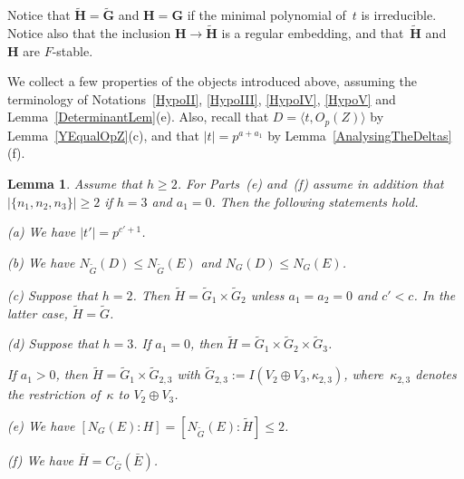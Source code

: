 \documentclass[12pt]{amsart}
\newcommand{\bG}{{\mathbf{G}}}      %
\newcommand{\bH}{{\mathbf{H}}}
\newtheorem{lem}[thm]{Lemma}
\theoremstyle{theorem}
\theoremstyle{definition}
\theoremstyle{remark}
\begin{document}
Notice that $\tilde{\bH} = \tilde{\bG}$ and $\bH = \bG$ if the minimal 
polynomial of~$t$ is irreducible. Notice also that the inclusion 
$\bH \rightarrow \tilde{\bH}$ is a regular embedding, and that~$\tilde{\bH}$ 
and ~$\bH$ are $F$-stable.

We collect a few properties of the objects introduced above, assuming the
terminology of
{\rm Notations~\ref{HypoII}, \ref{HypoIII}, \ref{HypoIV}, \ref{HypoV}} and
{\rm Lemma~\ref{DeterminantLem}(e)}. Also, recall that 
$D = \langle t , O_p( Z ) \rangle$ by Lemma~\ref{YEqualOpZ}(c),
and that $|t| = p^{a+a_1}$ by Lemma~\ref{AnalysingTheDeltas}(f).

\begin{lem}
\label{PropertiesOfDPrime}
Assume that $h \geq 2$. For Parts~{\rm (e)} and~{\rm (f)} assume in addition 
that $|\{ n_1, n_2, n_3 \}| \geq 2$ if $h = 3$ and $a_1 = 0$. Then the 
following statements hold.

{\rm (a)} We have $|t'| = p^{c'+1}$. 

{\rm (b)} We have $N_{\tilde{G}}( D ) \leq N_{\tilde{G}}( E )$ and 
$N_{G}( D ) \leq N_{G}( E )$.

{\rm (c)} Suppose that $h = 2$. Then 
$\tilde{H} = \tilde{G}_1 \times \tilde{G}_2$ unless $a_1 = a_2 = 0$ and 
$c' < c$. In the latter case, $\tilde{H} = \tilde{G}$.

{\rm (d)} Suppose that $h = 3$. If $a_1 = 0$,
then $\tilde{H} = \tilde{G}_1 \times \tilde{G}_2 \times \tilde{G}_3$.

If $a_1 > 0$, then $\tilde{H} = \tilde{G}_1 \times \tilde{G}_{2,3}$ with 
$\tilde{G}_{2,3} := I( {V}_2 \oplus {V}_3, \kappa_{2,3} )$, where~$\kappa_{2,3}$ 
denotes the restriction of~$\kappa$ to ${V}_2 \oplus {V}_3$.

{\rm (e)} We have
$[N_G( E )\colon\!H] = [N_{\tilde{G}}( E )\colon\!\tilde{H}] 
\leq 2$.

{\rm (f)} We have $\bar{H} = C_{\bar{G}}( \bar{E} )$.
\end{lem}
\end{document}

